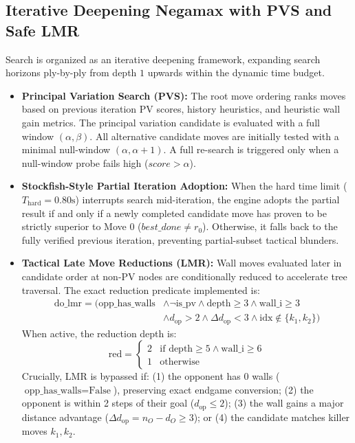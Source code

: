 \subsection{Iterative Deepening Negamax with PVS and Safe LMR}
Search is organized as an iterative deepening framework, expanding search horizons ply-by-ply from depth $1$ upwards within the dynamic time budget.
\begin{itemize}[leftmargin=1.5em]
    \item \textbf{Principal Variation Search (PVS):} The root move ordering ranks moves based on previous iteration PV scores, history heuristics, and heuristic wall gain metrics. The principal variation candidate is evaluated with a full window $(\alpha, \beta)$. All alternative candidate moves are initially tested with a minimal null-window $(\alpha, \alpha + 1)$. A full re-search is triggered only when a null-window probe fails high ($score > \alpha$).
    \item \textbf{Stockfish-Style Partial Iteration Adoption:} When the hard time limit ($T_{\text{hard}} = 0.80\text{s}$) interrupts search mid-iteration, the engine adopts the partial result if and only if a newly completed candidate move has proven to be strictly superior to Move 0 ($best\_done \neq r_0$). Otherwise, it falls back to the fully verified previous iteration, preventing partial-subset tactical blunders.
    \item \textbf{Tactical Late Move Reductions (LMR):} Wall moves evaluated later in candidate order at non-PV nodes are conditionally reduced to accelerate tree traversal. The exact reduction predicate implemented is:
    \begin{align}
        \text{do\_lmr} = (\text{opp\_has\_walls} &\land \neg\text{is\_pv} \land \text{depth} \ge 3 \land \text{wall\_i} \ge 3 \nonumber \\
        &\land d_{\text{op}} > 2 \land \Delta d_{\text{op}} < 3 \land \text{idx} \notin \{k_1, k_2\})
    \end{align}
    When active, the reduction depth is:
    \begin{equation}
        \text{red} = \begin{cases}
            2 & \text{if } \text{depth} \ge 5 \land \text{wall\_i} \ge 6 \\
            1 & \text{otherwise}
        \end{cases}
    \end{equation}
    Crucially, LMR is bypassed if: (1) the opponent has 0 walls ($\text{opp\_has\_walls} = \text{False}$), preserving exact endgame conversion; (2) the opponent is within 2 steps of their goal ($d_{\text{op}} \le 2$); (3) the wall gains a major distance advantage ($\Delta d_{\text{op}} = n_O - d_O \ge 3$); or (4) the candidate matches killer moves $k_1, k_2$.
\end{itemize}

